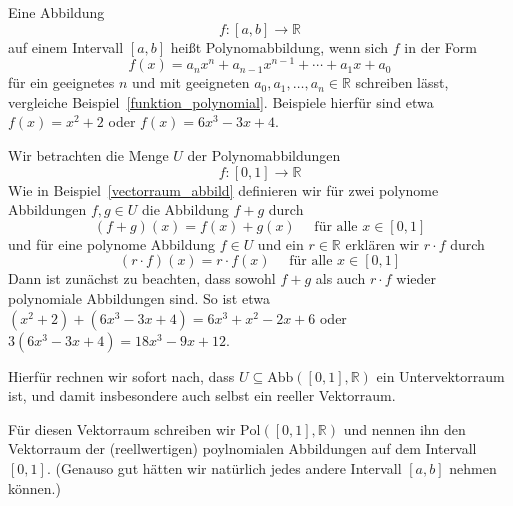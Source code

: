 \begin{beispiel}\label{vectorraum_poly} Eine Abbildung 
  	$$ f : [a,b] \longrightarrow \mathbb R $$
auf einem Intervall $[a,b]$ heißt Polynomabbildung, wenn sich $f$ in der Form 
  	$$ f(x) = a_n x^n + a_{n-1}x^{n-1} + \cdots + a_1 x + a_0 $$
für ein geeignetes $n$ und mit geeigneten $a_0, a_1, \ldots, a_n \in \mathbb R$ schreiben lässt, 
vergleiche Beispiel~\ref{funktion_polynomial}. Beispiele hierfür sind etwa $f(x) = x^2+2$ 
oder $f(x) = 6x^3 - 3x + 4$.
 
Wir betrachten die Menge $U$ der Polynomabbildungen 
  	$$ f : [0,1] \longrightarrow \mathbb R $$
Wie in Beispiel~\ref{vectorraum_abbild} definieren wir für
zwei polynome Abbildungen $f, g \in U$ die Abbildung $f + g$ durch
  	$$ (f+g)(x) = f(x) + g(x) \quad \textrm{ für alle } x \in [0, 1] $$
und für eine polynome Abbildung $f \in U$ und ein $r \in \mathbb R$ erklären wir 
$r \cdot f$ durch 
  	$$ (r \cdot f)(x) = r \cdot f(x) \quad \textrm{ für alle } x \in [0, 1] $$ 
Dann ist zunächst zu beachten, dass sowohl $f+g$ als auch $r \cdot f$ wieder 
polynomiale Abbildungen sind. So ist etwa $(x^2+2) + (6x^3 - 3x + 4) = 6x^3 + x^2 
- 2x + 6$ oder $3(6x^3 - 3x + 4) = 18 x^3 - 9 x + 12$. 

Hierfür rechnen wir sofort nach, dass $U \subseteq \mathrm{Abb}([0,1], \mathbb R)$ ein 
Untervektorraum ist, und damit insbesondere auch selbst ein reeller Vektorraum. 

Für diesen Vektorraum schreiben wir $\textrm{Pol}([0,1], \mathbb R)$ und nennen ihn 
den Vektorraum der (reellwertigen) poylnomialen Abbildungen auf 
dem Intervall $[0,1]$. (Genauso gut hätten wir natürlich jedes andere Intervall 
$[a,b]$ nehmen können.)
\end{beispiel}

